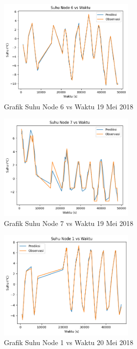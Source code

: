 \begin{figure}[H]
\setlength{}
\begin{center}
\includegraphics[width=0.6\textwidth]{fig/node6_temp_2018-05-19.png}
\caption{Grafik Suhu Node 6 vs Waktu 19 Mei 2018}
\label{fig:node619}
\end{center}
\end{figure}

\begin{figure}[H]
\setlength{}
\begin{center}
\includegraphics[width=0.6\textwidth]{fig/node7_temp_2018-05-19.png}
\caption{Grafik Suhu Node 7 vs Waktu 19 Mei 2018}
\label{fig:node719}
\end{center}
\end{figure}

\begin{figure}[H]
\setlength{}
\begin{center}
\includegraphics[width=0.6\textwidth]{fig/node1_temp_2018-05-20.png}
\caption{Grafik Suhu Node 1 vs Waktu 20 Mei 2018}
\label{fig:node120}
\end{center}
\end{figure}

